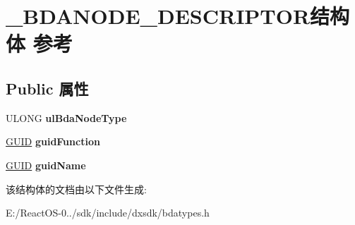 \hypertarget{struct___b_d_a_n_o_d_e___d_e_s_c_r_i_p_t_o_r}{}\section{\+\_\+\+B\+D\+A\+N\+O\+D\+E\+\_\+\+D\+E\+S\+C\+R\+I\+P\+T\+O\+R结构体 参考}
\label{struct___b_d_a_n_o_d_e___d_e_s_c_r_i_p_t_o_r}
\subsection*{Public 属性}
\begin{DoxyCompactItemize}
\item 
\mbox{\label{struct___b_d_a_n_o_d_e___d_e_s_c_r_i_p_t_o_r_a8ae54cc7ad43eaa3d6cb2b07b5f0f28b}} 
U\+L\+O\+NG {\bfseries ul\+Bda\+Node\+Type}
\item 
\mbox{\label{struct___b_d_a_n_o_d_e___d_e_s_c_r_i_p_t_o_r_a631c0a5a13dde4a6b81122f9f310d9ec}} 
\hyperlink{interface_g_u_i_d}{G\+U\+ID} {\bfseries guid\+Function}
\item 
\mbox{\label{struct___b_d_a_n_o_d_e___d_e_s_c_r_i_p_t_o_r_abb0c169d6996e5dd929901567dae1cdd}} 
\hyperlink{interface_g_u_i_d}{G\+U\+ID} {\bfseries guid\+Name}
\end{DoxyCompactItemize}


该结构体的文档由以下文件生成\+:\begin{DoxyCompactItemize}
\item 
E\+:/\+React\+O\+S-\/0../sdk/include/dxsdk/bdatypes.\+h\end{DoxyCompactItemize}
